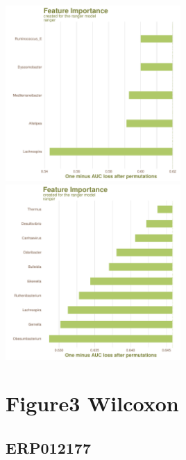\documentclass[
]{article}
\begin{document}
\includegraphics[width=0.5\textwidth,height=0.5\textheight]{../../Analysis_shotgun_PRJDB4176/03_ML/shotgun/atlas_binning/PRJDB4176_binning_best.model_draw_feature_importance_plot.pdf}
\includegraphics[width=0.5\textwidth,height=0.5\textheight]{../../Analysis_shotgun_PRJDB4176/03_ML/shotgun/krakens/PRJDB4176_best.model_draw_feature_importance_plot.pdf}

\hypertarget{figure3-wilcoxon}{%
\section{Figure3 Wilcoxon}\label{figure3-wilcoxon}}

\hypertarget{erp012177-1}{%
\subsection{ERP012177}\label{erp012177-1}}
\end{document}
